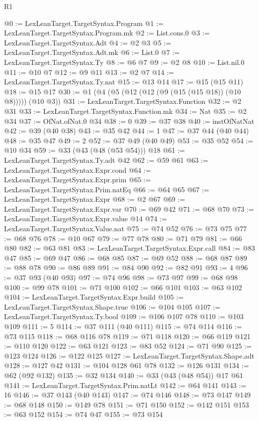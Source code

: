 \begin{lexlean}{R1}
\begin{coremodule}
@0 := LexLeanTarget.TargetSyntax.Program
@1 := LexLeanTarget.TargetSyntax.Program.mk
@2 := List.cons.{0}
@3 := LexLeanTarget.TargetSyntax.Adt
@4 := @2 @3
@5 := LexLeanTarget.TargetSyntax.Adt.mk
@6 := List.{0}
@7 := LexLeanTarget.TargetSyntax.Ty
@8 := @6 @7
@9 := @2 @8
@10 := List.nil.{0}
@11 := @10 @7
@12 := @9 @11
@13 := @2 @7
@14 := LexLeanTarget.TargetSyntax.Ty.nat
@15 := @13 @14
@17 := @15 (@15 @11)
@18 := @15 @17
@30 := @1 (@4 (@5 (@12 (@12 (@9 (@15 (@15 @18)) (@10 @8))))) (@10 @3))
@31 := LexLeanTarget.TargetSyntax.Function
@32 := @2 @31
@33 := LexLeanTarget.TargetSyntax.Function.mk
@34 := Nat
@35 := @2 @34
@37 := OfNat.ofNat.{0} @34
@38 := 0
@39 := @37 @38
@40 := instOfNatNat
@42 := @39 (@40 @38)
@43 := @35 @42
@44 := 1
@47 := @37 @44 (@40 @44)
@48 := @35 @47
@49 := 2
@52 := @37 @49 (@40 @49)
@53 := @35 @52
@54 := @10 @34
@59 := @33 (@43 (@48 (@53 @54))) @18
@61 := LexLeanTarget.TargetSyntax.Ty.adt @42
@62 := @59 @61
@63 := LexLeanTarget.TargetSyntax.Expr.cond
@64 := LexLeanTarget.TargetSyntax.Expr.prim
@65 := LexLeanTarget.TargetSyntax.Prim.natEq
@66 := @64 @65
@67 := LexLeanTarget.TargetSyntax.Expr
@68 := @2 @67
@69 := LexLeanTarget.TargetSyntax.Expr.var
@70 := @69 @42
@71 := @68 @70
@73 := LexLeanTarget.TargetSyntax.Expr.value @14
@74 := LexLeanTarget.TargetSyntax.Value.nat
@75 := @74 @52
@76 := @73 @75
@77 := @68 @76
@78 := @10 @67
@79 := @77 @78
@80 := @71 @79
@81 := @66 @80
@82 := @63 @81
@83 := LexLeanTarget.TargetSyntax.Expr.call
@84 := @83 @47
@85 := @69 @47
@86 := @68 @85
@87 := @69 @52
@88 := @68 @87
@89 := @88 @78
@90 := @86 @89
@91 := @84 @90
@92 := @82 @91
@93 := 4
@96 := @37 @93 (@40 @93)
@97 := @74 @96
@98 := @73 @97
@99 := @68 @98
@100 := @99 @78
@101 := @71 @100
@102 := @66 @101
@103 := @63 @102
@104 := LexLeanTarget.TargetSyntax.Expr.build
@105 := LexLeanTarget.TargetSyntax.Shape.true
@106 := @104 @105
@107 := LexLeanTarget.TargetSyntax.Ty.bool
@109 := @106 @107 @78
@110 := @103 @109
@111 := 5
@114 := @37 @111 (@40 @111)
@115 := @74 @114
@116 := @73 @115
@118 := @68 @116 @78
@119 := @71 @118
@120 := @66 @119
@121 := @110 @120
@122 := @63 @121
@123 := @83 @52
@124 := @71 @90
@125 := @123 @124
@126 := @122 @125
@127 := LexLeanTarget.TargetSyntax.Shape.adt
@128 := @127 @42
@131 := @104 @128 @61 @78
@132 := @126 @131
@134 := @62 (@92 @132)
@135 := @32 @134
@140 := @33 (@43 (@48 @54)) @17 @61
@141 := LexLeanTarget.TargetSyntax.Prim.natLt
@142 := @64 @141
@143 := 16
@146 := @37 @143 (@40 @143)
@147 := @74 @146
@148 := @73 @147
@149 := @68 @148
@150 := @149 @78
@151 := @71 @150
@152 := @142 @151
@153 := @63 @152
@154 := @74 @47
@155 := @73 @154

\end{coremodule}
\end{lexlean}
